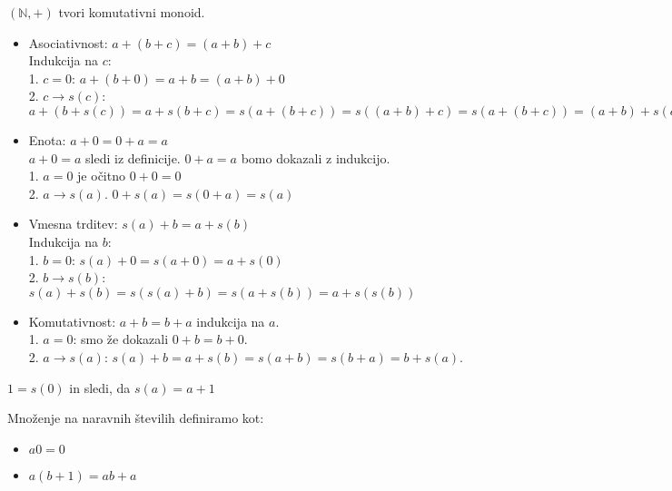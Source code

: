 \begin{trditev}
    $(\mathbb{N}, +)$ tvori komutativni monoid.
\end{trditev}
\begin{dokaz}
    \begin{itemize}

    \item Asociativnost: $a + (b + c) = (a + b) + c$ \\
    Indukcija na $c$: \\
    1. $c = 0$: $a + (b + 0) = a + b = (a + b) + 0$ \\
    2. $c \to s(c)$: $a + (b + s(c)) = a + s(b + c) = s(a + (b + c)) = s((a + b) + c) = s(a + (b + c)) = (a + b) + s(c)$ \\

    \item Enota: $a + 0 = 0 + a = a$ \\
    $a + 0 = a$ sledi iz definicije. $0 + a = a$ bomo dokazali z indukcijo. \\
    1. $a = 0$ je očitno $0 + 0 = 0$ \\
    2. $a \to s(a)$. $0 + s(a) = s(0 + a) = s(a)$ \\

    \item Vmesna trditev: $s(a) + b = a + s(b)$ \\
    Indukcija na $b$: \\
    1. $b = 0$: $s(a) + 0 = s(a + 0) = a + s(0)$ \\
    2. $b \to s(b)$: $s(a) + s(b) = s(s(a) + b) = s(a + s(b)) = a + s(s(b))$ \\

    \item Komutativnost: $a + b = b + a$ indukcija na $a$. \\
    1. $a = 0$: smo že dokazali $0 + b = b + 0$. \\
    2. $a \to s(a)$: $s(a) + b = a + s(b) = s(a + b) = s(b + a) = b + s(a)$.
    \end{itemize}
\end{dokaz}

\begin{definicija}
    $1 = s(0)$ in sledi, da $s(a) = a + 1$
\end{definicija}

\begin{definicija}
    Množenje na naravnih številih definiramo kot:
    \begin{itemize}
        \item $a0 = 0$
        \item $a(b + 1) = ab + a$
    \end{itemize}
\end{definicija}

